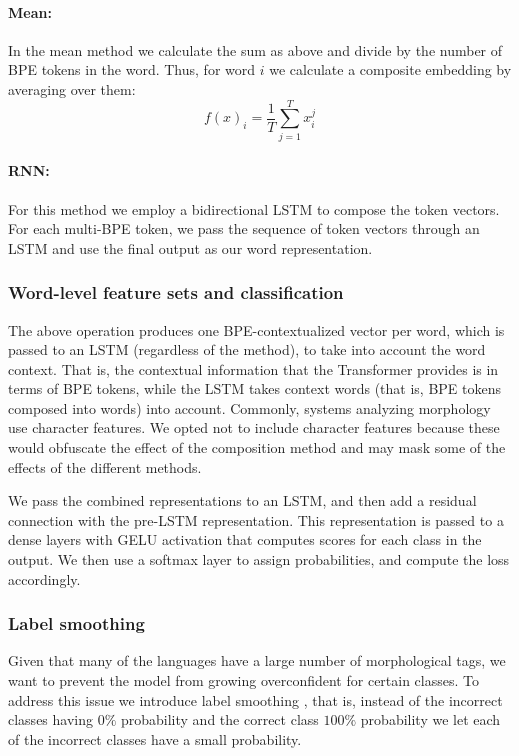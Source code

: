\documentclass[11pt]{article}
\begin{document}
     \paragraph{Mean:} In the mean method we calculate the sum as above and
     divide by the number of BPE tokens in the word. Thus, for
     word $i$ we calculate a composite embedding by averaging over
     them:
	\begin{equation}
	f(x)_{i} = \frac{1}{T}\sum_{j=1}^{T} x_i^j
	\end{equation}
	
	
     \paragraph{RNN:} For this method we employ a bidirectional
     LSTM to compose the token vectors. For each multi-BPE token, we
     pass the sequence of token vectors through an LSTM and use the
     final output as our word representation.

     \subsubsection{Word-level feature sets and classification}
         The above operation produces one BPE-contextualized vector per word,
     which is passed to an LSTM (regardless of the method), to take
     into account the word context. That is, the contextual
     information that the Transformer provides is in terms of BPE tokens,
     while the LSTM takes context words (that is, BPE tokens composed
     into words) into account.
    Commonly, systems analyzing morphology use character features. We
     opted not to include character features because these would
     obfuscate the effect of the composition method and may mask some
     of the effects of the different methods.

    We pass the combined representations to an LSTM, and then add a
     residual connection with the pre-LSTM representation.  This
     representation is passed to a dense layers with GELU activation
     that computes scores for each class in the output. We then use a
     softmax layer to assign probabilities, and compute the loss
     accordingly.

	\subsubsection{Label smoothing}
    	Given that many of the languages have a large number of
     morphological tags, we want to prevent the model from growing
     overconfident for certain classes. To address this issue we
     introduce label smoothing \cite{szegedy2016rethinking}, that is,
     instead of the incorrect classes having $0\%$ probability and the
     correct class $100\%$ probability we let each of the incorrect
     classes have a small probability.
\end{document}
